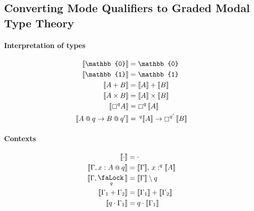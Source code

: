 \documentclass[acmsmall,screen,nonacm]{acmart}
\makeatletter
\newcommand{\at}{\mathbin{\mbox{\small\ensuremath{@}}}}
\newcommand{\unit}{\mathbb{1}}
\newcommand{\zero}{\mathbb{0}}
\DeclareMathOperator{\lock}{\tikz{\node[scale=1, line width=0pt, inner sep=0pt] at (0,0) {\faLock\,};}}
\newcommand{\sem}[1]{\llbracket #1 \rrbracket}
\makeatother
\begin{document}
\subsection{Converting Mode Qualifiers to Graded Modal Type Theory}

\paragraph{Interpretation of types}
%
\begin{align*}
  \sem{\zero} &= \zero \\
  \sem{\unit} &= \unit \\
  \sem{A + B} &= \sem{A} + \sem{B} \\
  \sem{A \times B} &= \sem{A} \times \sem{B} \\
  \sem{\boxempty^{q} A} &= \boxempty^{q}\, \sem{A} \\
  \sem{A \at q \rightarrow B \at q'} &= \,^q \sem{A} \rightarrow \boxempty^{q'}\, \sem{B}
\end{align*}

\paragraph{Contexts}
%
\begin{align*}
  \sem{\cdot} &= \cdot \\
  \sem{\Gamma, x : A \at q} &= \sem{\Gamma},\, x :^q \sem{A} \\
  \sem{\Gamma, \lock_q} &= \sem{\Gamma} \setminus q \\
  \sem{\Gamma_1 + \Gamma_2} &= \sem{\Gamma_1} + \sem{\Gamma_2} \\
  \sem{q \cdot \Gamma_1} &= q \cdot \sem{\Gamma_1}
\end{align*}
\end{document}
